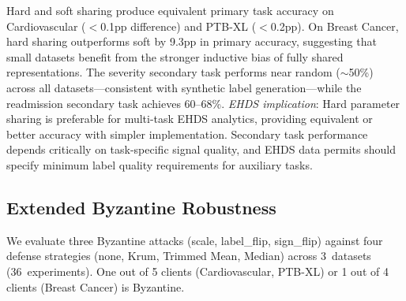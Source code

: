 \documentclass[conference]{IEEEtran}
\begin{document}
\begin{table}[htbp]
\centering
\caption{Multi-Task FL: Primary and Secondary Task Accuracy (\%)}
\label{tab:multitask_fl}

\vspace{1mm}
\footnotesize{Hard and soft sharing produce equivalent primary task accuracy on Cardiovascular ($<$0.1pp difference) and PTB-XL ($<$0.2pp). On Breast Cancer, hard sharing outperforms soft by 9.3pp in primary accuracy, suggesting that small datasets benefit from the stronger inductive bias of fully shared representations. The severity secondary task performs near random ($\sim$50\%) across all datasets---consistent with synthetic label generation---while the readmission secondary task achieves 60--68\%. \textit{EHDS implication}: Hard parameter sharing is preferable for multi-task EHDS analytics, providing equivalent or better accuracy with simpler implementation. Secondary task performance depends critically on task-specific signal quality, and EHDS data permits should specify minimum label quality requirements for auxiliary tasks.}
\end{table}

\subsection{Extended Byzantine Robustness}
\label{sec:byzantine_extended}

We evaluate three Byzantine attacks (scale, label\_flip, sign\_flip) against four defense strategies (none, Krum, Trimmed Mean, Median) across 3~datasets (36~experiments). One out of 5 clients (Cardiovascular, PTB-XL) or 1 out of 4 clients (Breast Cancer) is Byzantine.
\end{document}
